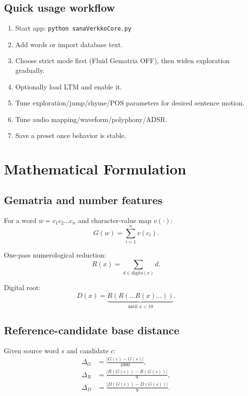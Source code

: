 \documentclass[11pt,a4paper]{report}
\begin{document}
\section{Quick usage workflow}
\begin{enumerate}
  \item Start app: \texttt{python sanaVerkkoCore.py}
  \item Add words or import database text.
  \item Choose strict mode first (Fluid Gematria OFF), then widen exploration gradually.
  \item Optionally load LTM and enable it.
  \item Tune exploration/jump/rhyme/POS parameters for desired sentence motion.
  \item Tune audio mapping/waveform/polyphony/ADSR.
  \item Save a preset once behavior is stable.
\end{enumerate}

\chapter{Mathematical Formulation}
\section{Gematria and number features}
For a word $w = c_1c_2\dots c_n$ and character-value map $v(\cdot)$:
\begin{equation}
G(w) = \sum_{i=1}^{n} v(c_i).
\end{equation}

One-pass numerological reduction:
\begin{equation}
R(x) = \sum_{d \in \text{digits}(x)} d.
\end{equation}

Digital root:
\begin{equation}
D(x) = \underbrace{R(R(\dots R(x) \dots))}_{\text{until } x < 10}.
\end{equation}

\section{Reference-candidate base distance}
Given source word $s$ and candidate $c$:
\begin{align}
\Delta_G &= \frac{|G(c)-G(s)|}{1000}, \\
\Delta_R &= \frac{|R(G(c))-R(G(s))|}{9}, \\
\Delta_D &= \frac{|D(G(c))-D(G(s))|}{9}.
\end{align}
\end{document}
